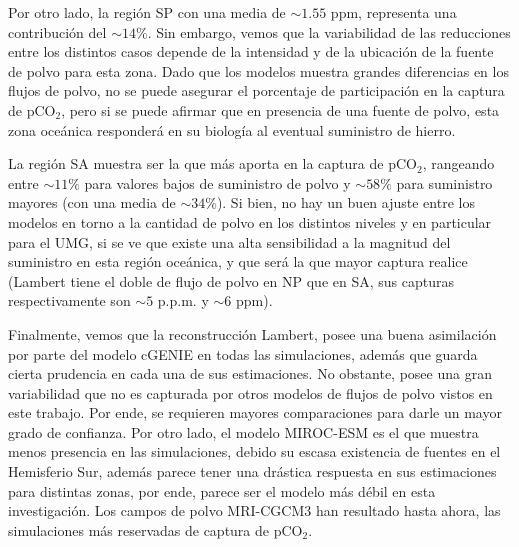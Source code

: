 Por otro lado, la región SP con una media de $\sim 1.55$ ppm, representa una contribución del $\sim 14\%$. Sin embargo, vemos que la variabilidad de las reducciones entre los distintos casos depende de la intensidad y de la ubicación de la fuente de polvo para esta zona. Dado que los modelos muestra grandes diferencias en los flujos de polvo, no se puede asegurar el porcentaje de participación en la captura de pCO$_2$, pero si se puede afirmar que en presencia de una fuente de polvo, esta zona oceánica responderá en su biología al eventual suministro de hierro. 

La región SA muestra ser la que más aporta en la captura de pCO$_2$, rangeando entre $\sim 11\%$ para valores bajos de suministro de polvo y $\sim 58\%$ para suministro mayores (con una media de $\sim 34\%$). Si bien, no hay un buen ajuste entre los modelos en torno a la cantidad de polvo en los distintos niveles y en particular para el UMG, si se ve que existe una alta sensibilidad a la magnitud del suministro en esta región oceánica, y que será la que mayor captura realice (Lambert tiene el doble de flujo de polvo en NP que en SA, sus capturas respectivamente son $\sim 5$ p.p.m. y $\sim 6$ ppm). 

Finalmente, vemos que la reconstrucción Lambert, posee una buena asimilación por parte del modelo cGENIE en todas las simulaciones, además que guarda cierta prudencia en cada una de sus estimaciones. No obstante, posee una gran variabilidad que no es capturada por otros modelos de flujos de polvo vistos en este trabajo. Por ende, se requieren mayores comparaciones para darle un mayor grado de confianza. Por otro lado, el modelo MIROC-ESM es el que muestra menos presencia en las simulaciones, debido su escasa existencia de fuentes en el Hemisferio Sur, además parece tener una drástica respuesta en sus estimaciones para distintas zonas, por ende, parece ser el modelo más débil en esta investigación. Los campos de polvo MRI-CGCM3 han resultado hasta ahora, las simulaciones más reservadas de captura de pCO$_2$. 